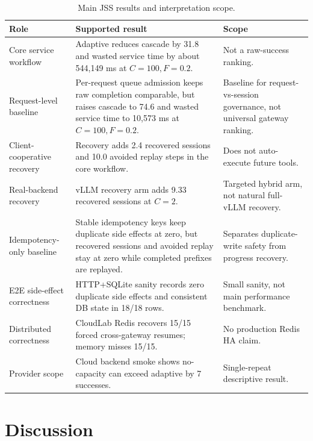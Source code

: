 \documentclass[5p,times]{elsarticle}
\begin{document}
\begin{table}[t]
\centering
\caption{Main JSS results and interpretation scope.}
\label{tab:main_results_summary}
\scriptsize
\renewcommand{\arraystretch}{0.95}
\begin{tabular}{@{}>{\raggedright\arraybackslash}p{}>{\raggedright\arraybackslash}p{}>{\raggedright\arraybackslash}p{}@{}}
\toprule
\textbf{Role} & \textbf{Supported result} & \textbf{Scope} \\
\midrule
Core service workflow & Adaptive reduces cascade by 31.8 and wasted service time by about 544,149 ms at $C{=}100,F{=}0.2$. & Not a raw-success ranking. \\
Request-level baseline & Per-request queue admission keeps raw completion comparable, but raises cascade to 74.6 and wasted service time to 10,573 ms at $C{=}100,F{=}0.2$. & Baseline for request-vs-session governance, not universal gateway ranking. \\
Client-cooperative recovery & Recovery adds 2.4 recovered sessions and 10.0 avoided replay steps in the core workflow. & Does not auto-execute future tools. \\
Real-backend recovery & vLLM recovery arm adds 9.33 recovered sessions at $C{=}2$. & Targeted hybrid arm, not natural full-vLLM recovery. \\
Idempotency-only baseline & Stable idempotency keys keep duplicate side effects at zero, but recovered sessions and avoided replay stay at zero while completed prefixes are replayed. & Separates duplicate-write safety from progress recovery. \\
E2E side-effect correctness & HTTP+SQLite sanity records zero duplicate side effects and consistent DB state in 18/18 rows. & Small sanity, not main performance benchmark. \\
Distributed correctness & CloudLab Redis recovers 15/15 forced cross-gateway resumes; memory misses 15/15. & No production Redis HA claim. \\
Provider scope & Cloud backend smoke shows no-capacity can exceed adaptive by 7 successes. & Single-repeat descriptive result. \\
\bottomrule
\end{tabular}
\renewcommand{\arraystretch}{1.0}
\end{table}

\section{Discussion}
\label{sec:discussion}
\end{document}
